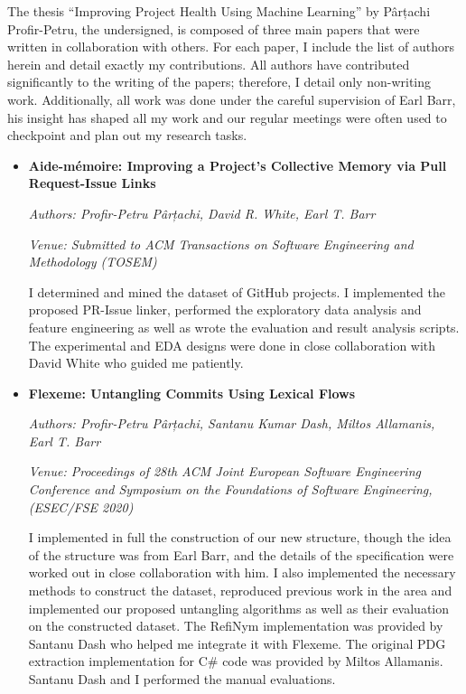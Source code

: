 The thesis “Improving Project Health Using Machine Learning” by Pârțachi
Profir-Petru, the undersigned, is composed of three main papers that were
written in collaboration with others. For each paper, I include the list of
authors herein and detail exactly my contributions. All authors have contributed
significantly to the writing of the papers; therefore, I detail only non-writing
work. Additionally, all work was done under the careful supervision of Earl
Barr, his insight has shaped all my work and our regular meetings were often
used to checkpoint and plan out my research tasks.

\begin{itemize}[leftmargin=*]
    \item[] \textbf{Aide-mémoire: Improving a Project’s Collective Memory via
Pull Request-Issue Links} 
    
    \noindent\emph{Authors: Profir-Petru Pârțachi, David R. White, Earl T. Barr}
    
    \noindent\emph{Venue: Submitted to ACM Transactions on Software Engineering
    and Methodology (TOSEM)}

    \noindent I determined and mined the dataset of GitHub projects. I 
    implemented the proposed PR-Issue linker, performed the exploratory data
    analysis and feature engineering as well as wrote the evaluation and result
    analysis scripts. The experimental and EDA designs were done in close
    collaboration with David White who guided me patiently.

    \item[] \noindent\textbf{Flexeme: Untangling Commits Using Lexical Flows}
    
    \noindent\emph{Authors: Profir-Petru Pârțachi, Santanu Kumar Dash, Miltos
    Allamanis, Earl T. Barr}
    
    \noindent\emph{Venue: Proceedings of 28th ACM Joint European Software
    Engineering Conference and Symposium on the Foundations of Software
    Engineering, (ESEC/FSE 2020)}

    \noindent  I implemented in full the construction of our new structure,
    though the idea of the structure was from Earl Barr, and the details of the
    specification were worked out in close collaboration with him. I also
    implemented the necessary methods to construct the dataset, reproduced
    previous work in the area and implemented our proposed untangling algorithms
    as well as their evaluation on the constructed dataset. The RefiNym
    implementation was provided by Santanu Dash who helped me integrate it with
    Flexeme. The original PDG extraction implementation for C\# code was
    provided by Miltos Allamanis. Santanu Dash and I performed the manual
    evaluations.
    

\end{itemize}

